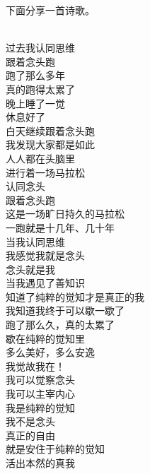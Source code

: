 下面分享一首诗歌。

\begin{poem}[我觉故我在]
    \begin{multicols}{3}
        \centering~\\
        过去我认同思维 \\ 跟着念头跑 \\ 跑了那么多年 \\ 真的跑得太累了 \\ 晚上睡了一觉 \\ 休息好了 \\ 白天继续跟着念头跑 \\ 我发现大家都是如此 \\ 人人都在头脑里 \\ 进行着一场马拉松 \\ 认同念头 \\ 跟着念头跑 \\ 这是一场旷日持久的马拉松 \\ 一跑就是十几年、几十年 \\ 当我认同思维 \\ 我感觉我就是念头 \\ 念头就是我 \\ 当我遇见了善知识 \\ 知道了纯粹的觉知才是真正的我 \\ 我知道我终于可以歇一歇了 \\ 跑了那么久，真的太累了 \\ 歇在纯粹的觉知里 \\ 多么美好，多么安逸 \\ 我觉故我在！ \\ 我可以觉察念头 \\ 我可以主宰内心 \\ 我是纯粹的觉知 \\ 我不是念头 \\ 真正的自由 \\ 就是安住于纯粹的觉知 \\ 活出本然的真我
    \end{multicols}
\end{poem}
